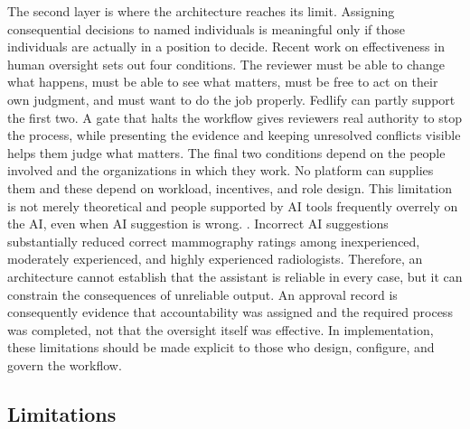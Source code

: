 \documentclass[preprint,5p, 10pt, times]{elsarticle}
\begin{document}
The second layer is where the architecture reaches its limit.
%
Assigning consequential decisions to named individuals is meaningful only if those individuals are actually in a position to decide.
%
Recent work on effectiveness in human oversight sets out four conditions. The reviewer must be able to change what happens, must be able to see what matters, must be free to act on their own judgment, and must want to do the job properly\cite{sterz2024quest}.
%
Fedlify can partly support the first two. A gate that halts the workflow gives reviewers real authority to stop the process, while presenting the evidence and keeping unresolved conflicts visible helps them judge what matters.
%
The final two conditions depend on the people involved and the organizations in which they work.
No platform can supplies them and these depend on workload, incentives, and role design.
This limitation is not merely theoretical and 
people supported by AI tools frequently overrely on the AI, even when AI suggestion is wrong. \cite{buccinca2021trust}.
Incorrect AI suggestions substantially reduced correct
mammography ratings among inexperienced, moderately experienced, and highly experienced radiologists\cite{dratsch2023automation}.
%
Therefore, an architecture cannot establish that the assistant is reliable in every case, but it can constrain the consequences of unreliable output. An approval record is consequently evidence that accountability was assigned and the required process was completed, not that the oversight itself was effective. In implementation, these limitations should be made explicit to those who design, configure, and govern the workflow.


\subsection*{Limitations}
\end{document}
